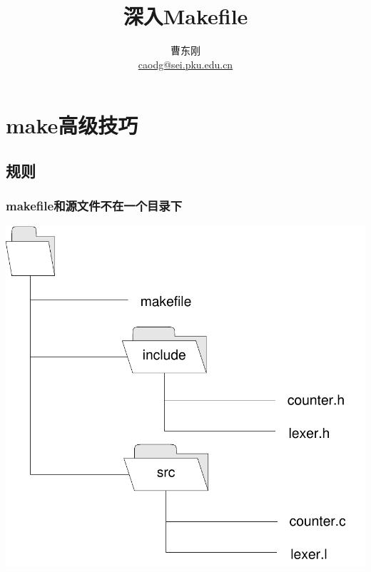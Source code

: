 \documentclass[compress]{beamer}
\begin{document}
					
\title{深入Makefile}

\author[\href{http://c.pku.edu.cn/}{http://c.pku.edu.cn/}]
{曹东刚\\\href{mailto:caodg@sei.pku.edu.cn}{caodg@sei.pku.edu.cn}}


\date{}


\begin{frame}
	\titlepage
\end{frame}

\section{make高级技巧}


\subsection{规则}

\begin{frame}
\frametitle{makefile和源文件不在一个目录下}

\includegraphics[width=0.7\hsize]{folder.pdf}


\end{frame}
\end{document}
